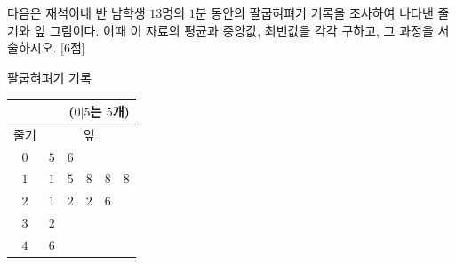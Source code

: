 다음은 재석이네 반 남학생 $13$명의 $1$분 동안의 팔굽혀펴기 기록을 조사하여 나타낸 줄기와 잎 그림이다. 이때 이 자료의 평균과 중앙값, 최빈값을 각각 구하고, 그 과정을 서술하시오. \mbox{[6점]}\par\smallskip\begin{center}{\small 팔굽혀펴기 기록}\par\begin{tabular}{c|l}\multicolumn{2}{r}{\scriptsize ($0|5$는 $5$개)}\\ \hline 줄기 & \multicolumn{1}{c}{잎} \\ \hline $0$ & $5\quad 6$ \\ $1$ & $1\quad 5\quad 8\quad 8\quad 8$ \\ $2$ & $1\quad 2\quad 2\quad 6$ \\ $3$ & $2$ \\ $4$ & $6$ \\ \hline\end{tabular}\end{center}
